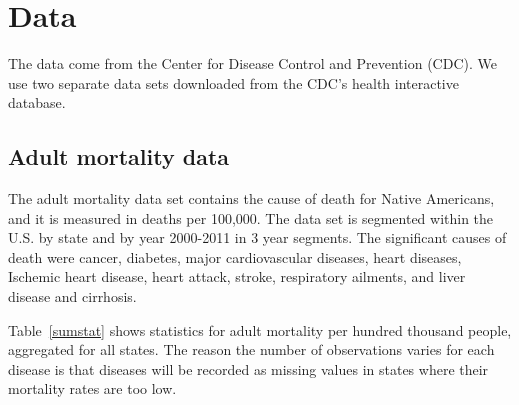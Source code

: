 \documentclass[12pt]{article}
\begin{document}
\section{Data}
The data come from the Center for Disease Control and Prevention (CDC). We use two separate data sets downloaded from the CDC's health interactive database.

\subsection{Adult mortality data}
The adult mortality data set contains the cause of death for Native Americans, and it is measured in deaths per 100,000.
The data set is segmented within the U.S. by state and by year 2000-2011 in 3 year segments.
The significant causes of death were cancer, diabetes, major cardiovascular diseases, heart diseases, Ischemic heart disease, heart attack, stroke, respiratory ailments, and liver disease and cirrhosis.

Table~\ref{sumstat} shows statistics for adult mortality per hundred thousand people, aggregated for all states.
The reason the number of observations varies for each disease is that diseases will be recorded as missing values in states where their mortality rates are too low.
\end{document}
